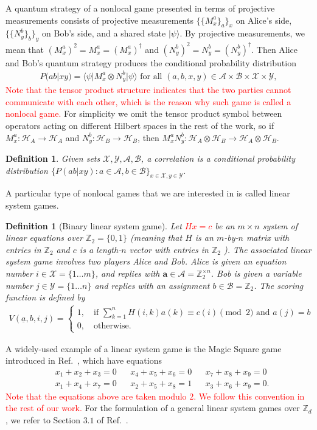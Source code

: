 \documentclass[11pt,letterpaper]{article}
\newcommand{\ket}[1]{|#1\rangle}
\newcommand{\bra}[1]{\langle#1|}
\newcommand{\x}{\otimes}
\newcommand{\Z}{\mathbb{Z}}
\newcommand{\calH}{\mathcal{H}}
\newcommand{\calX}{\mathcal{X}}
\newcommand{\calY}{\mathcal{Y}}
\newcommand{\calA}{\mathcal{A}}
\newcommand{\calB}{\mathcal{B}}
\newcommand{\1}{\mathbb{1}}
\newcommand{\ua}{\underline{a}}
\newcommand{\ba}{\pmb{a}}
\newcommand{\pr}[2]{P(#1|#2)}
\def\carl#1{{\color{blue} #1}}
\newcommand{\hf}[1]{\textcolor{red}{#1}}
\newtheorem{definition}[theorem]{Definition}
\theoremstyle{definition}
\begin{document}
A quantum strategy of a nonlocal game presented in terms of projective measurements
consists of projective measurements $\{\{M_x^a\}_a\}_x$ on Alice's side, 
$\{\{N_y^b\}_b\}_y$ on Bob's side, and a shared state $\ket{\psi}$. 
By projective measurements, we mean that  
$(M_x^a)^2 = M_x^a = (M_x^a)^\dagger$ and $(N_y^b)^2 = N_y^b = (N_y^b)^\dagger$.
Then Alice and Bob's quantum strategy produces the conditional probability distribution
\begin{align}
	\pr{ab}{xy} = \bra{\psi} M_x^a \x N_y^b \ket{\psi} \text{ for all } (a,b,x,y) \in \calA \times \calB \times \calX \times \calY,
\end{align}
\hf{Note that the tensor product structure indicates that the
two parties cannot communicate with each other, which is the reason why such game is called a nonlocal game.}
For simplicity we omit the tensor product symbol between operators acting on different Hilbert spaces in the rest of the work, so if $M_x^a : \calH_A \rightarrow \calH_A$ and $N_y^b: 
\calH_B \rightarrow \calH_B$, then $M_x^a N_y^b: \calH_A\x \calH_B \rightarrow \calH_A \x \calH_B$.
\begin{definition}
	Given sets $\calX, \calY, \calA, \calB$, a correlation is a conditional probability distribution
	$\{\pr{ab}{xy}: a \in \calA, b \in \calB\}_{x \in \calX, y \in \calY}$.  
\end{definition}
A particular type of nonlocal games that we are interested in is called linear system games.
\begin{definition}[Binary linear system game]
 Let \hf{$Hx = c$} be an $m \times n$ system of linear equations over $\Z_2 = \{0, 1\}$ \carl{(meaning that} $H$ is an $m$-by-$n$ matrix with entries in $\Z_2$ and 
 $c$ is a length-$n$ vector with entries in $\Z_2$\carl{)}. 
 The associated linear system game involves two
 players Alice and Bob. 
 Alice is given an equation number $i \in \calX = \{1 \dots m\}$,
 and replies with $\ba \in \calA = \Z_2^{\times n}$.
 Bob is given a variable number $j \in \calY = \{1 \dots n\}$ and replies with an assignment $b \in \calB = \Z_2$. The 
 scoring function is defined by
 \begin{align}
 	V(\ua, b, i, j) =
	\begin{cases}
		1, \quad \text{if } \sum_{k=1}^n H(i,k) a(k) \equiv c(i) \pmod 2 \text{ and } a(j) = b \\
		0,  \quad \text{otherwise.}
	\end{cases}
\end{align}
\end{definition}
A widely-used example of a linear system game is the Magic Square game introduced in Ref.~\cite{magic_square}, which 
have equations
\begin{align*}
    &x_1 + x_2 + x_3 = 0 && x_4 + x_5 + x_6 = 0 &&
    x_7 + x_8 + x_9 = 0 \\
    &x_1 + x_4 + x_7 = 0 && x_2 + x_5 + x_8 = 1 &&
    x_3 + x_6 + x_9 = 0.
\end{align*}
\hf{Note that the equations above are taken modulo $2$.
We follow this convention in the rest of our work.}
For the formulation of a general linear system games over $\Z_d$, we refer to Section $3.1$ of Ref.~\cite{coladan2017}.
\end{document}
